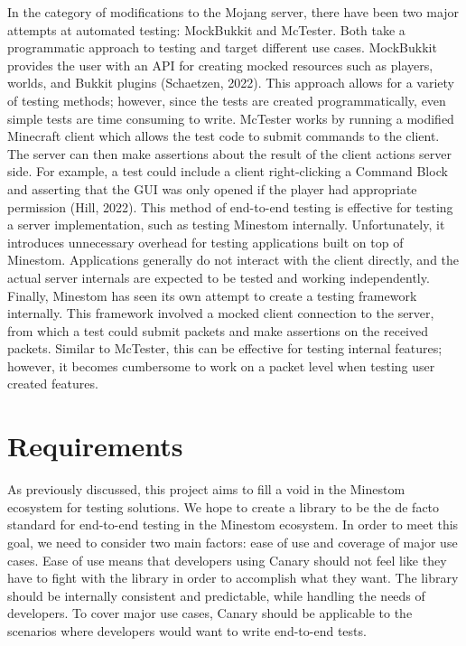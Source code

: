 \documentclass{article}
\begin{document}
\begin{onehalfspacing}
In the category of modifications to the Mojang server, there have been
two major attempts at automated testing: MockBukkit and McTester. Both
take a programmatic approach to testing and target different use cases.
MockBukkit provides the user with an API for creating mocked resources
such as players, worlds, and Bukkit plugins (Schaetzen, 2022). This
approach allows for a variety of testing methods; however, since the
tests are created programmatically, even simple tests are time consuming
to write. McTester works by running a modified Minecraft client which
allows the test code to submit commands to the client. The server can
then make assertions about the result of the client actions server side.
For example, a test could include a client right-clicking a Command
Block and asserting that the GUI was only opened if the player had
appropriate permission (Hill, 2022). This method of end-to-end testing
is effective for testing a server implementation, such as testing
Minestom internally. Unfortunately, it introduces unnecessary overhead
for testing applications built on top of Minestom. Applications
generally do not interact with the client directly, and the actual
server internals are expected to be tested and working independently.
Finally, Minestom has seen its own attempt to create a testing framework
internally. This framework involved a mocked client connection to the
server, from which a test could submit packets and make assertions on
the received packets. Similar to McTester, this can be effective for
testing internal features; however, it becomes cumbersome to work on a
packet level when testing user created features.

\section{Requirements}

As previously discussed, this project aims to fill a void in the
Minestom ecosystem for testing solutions. We hope to create a library to
be the de facto standard for end-to-end testing in the Minestom
ecosystem. In order to meet this goal, we need to consider two main
factors: ease of use and coverage of major use cases. Ease of use means
that developers using Canary should not feel like they have to fight
with the library in order to accomplish what they want. The library
should be internally consistent and predictable, while handling the
needs of developers. To cover major use cases, Canary should be
applicable to the scenarios where developers would want to write
end-to-end tests.


\end{onehalfspacing}
\end{document}
